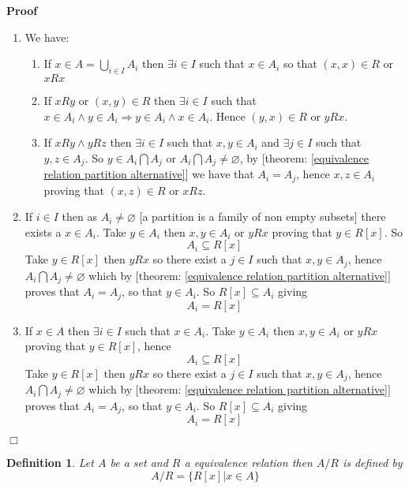 \documentclass{book}
\newenvironment{proof}{\noindent\textbf{Proof\ }}{\hspace*{\fill}$\Box$\medskip}
\newtheorem{definition}{Definition}
{\theorembodyfont{\rmfamily}\newtheorem{example}{Example}}
\begin{document}
\begin{proof}
  
  \begin{enumerate}
    \item We have:
    \begin{enumerate}
      \item If $x \in A = \bigcup_{i \in I} A_i$ then $\exists i \in I$ such
      that $x \in A_i$ so that $(x, x) \in R$ or $x R x$
      
      \item If $x R y$ or $(x, y) \in R$ then $\exists i \in I$ such that $x
      \in A_i \wedge y \in A_i \Rightarrow y \in A_i \wedge x \in A_i$. Hence
      $(y, x) \in R$ or $y R x$.
      
      \item If $x R y \wedge y R z$ then $\exists i \in I$ such that $x, y \in
      A_i$ and $\exists j \in I$ such that $y, z \in A_j$. So $y \in A_i
      \bigcap A_j$ or $A_i \bigcap A_j \neq \varnothing$, by [theorem:
      \ref{equivalence relation partition alternative}] we have that $A_i =
      A_j$, hence $x, z \in A_i$ proving that $(x, z) \in R$ or $x R z$.
    \end{enumerate}
    \item If $i \in I$ then as $A_i \neq \varnothing$ [a partition is a family
    of non empty subsets] there exists a $x \in A_i$. Take $y \in A_i$ then
    $x, y \in A_i$ or $y R x$ proving that $y \in R [x]$. So
    \[ A_i \subseteq R [x] \]
    Take $y \in R [x]$ then $y R x$ so there exist a $j \in I$ such that $x, y
    \in A_j$, hence $A_i \bigcap A_j \neq \varnothing$ which by [theorem:
    \ref{equivalence relation partition alternative}] proves that $A_i = A_j$,
    so that $y \in A_i$. So $R [x] \subseteq A_i$ giving
    \[ A_i = R [x] \]
    \item If $x \in A$ then $\exists i \in I$ such that $x \in A_i$. Take $y
    \in A_i$ then $x, y \in A_i$ or $y R x$ proving that $y \in R [x]$, hence
    \[ A_i \subseteq R [x] \]
    Take $y \in R [x]$ then $y R x$ so there exist a $j \in I$ such that $x,
    y \in A_j$, hence $A_i \bigcap A_j \neq \varnothing$ which by [theorem:
    \ref{equivalence relation partition alternative}] proves that $A_i = A_j$,
    so that $y \in A_i$. So $R [x] \subseteq A_i$ giving
    \[ A_i = R [x] \]
  \end{enumerate}
  
\end{proof}

\begin{definition}
  \label{equivalence relation A/R}{}Let $A$ be a set and $R$ a
  equivalence relation then $A / R$ is defined by
  \[ A / R = \{ R [x] |x \in A \} \]
\end{definition}
\end{document}
